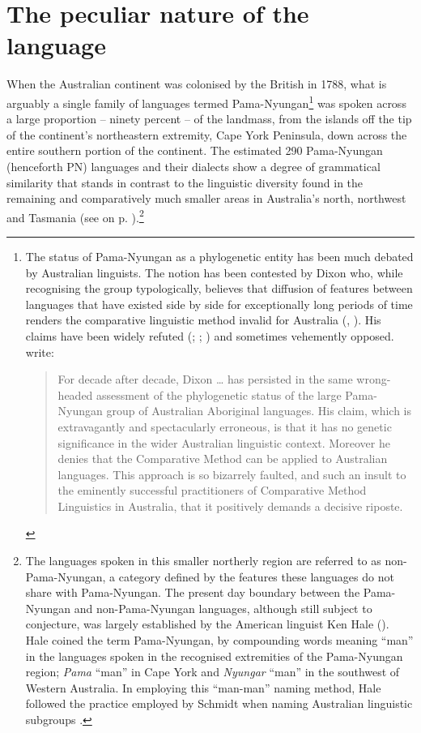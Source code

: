 \chapter{The peculiar nature of the language}
\label{chap:key:1}

When the Australian continent was colonised by the British in 1788, what is arguably a single family of languages \citep{bowern_computational_2012} termed Pama-Nyungan\footnote{The status of Pama-Nyungan as a phylogenetic entity has been much debated by Australian linguists. The notion has been contested by Dixon who, while recognising the group typologically, believes that diffusion of features between languages that have existed side by side for exceptionally long periods of time renders the comparative linguistic method invalid for Australia (\citeyear[225--226, 226--227]{dixon_languages_1980}, \citeyear[xix, 48, 53]{dixon_australian_2002}). His claims have been widely refuted (\citealt{bowern_anotherlook_2006, bowern_computational_2012}; \citealt{evans_enigma_1998}; \citealt[40]{koch_historical_2014}) and sometimes vehemently opposed. \citet*[69]{ogrady_coherence_2004} write: 

\begin{quote}
For decade after decade, Dixon … has persisted in the same wrong-headed assessment of the phylogenetic status of the large Pama-Nyungan group of Australian Aboriginal languages. His claim, which is extravagantly and spectacularly erroneous, is that it has no genetic significance in the wider Australian linguistic context. Moreover he denies that the Comparative Method can be applied to Australian languages.
This approach is so bizarrely faulted, and such an insult to the eminently successful practitioners of Comparative Method Linguistics in Australia, that it positively demands a decisive riposte.
\end{quote}} was spoken across a large proportion -- ninety percent -- of the landmass, from the islands off the tip of the continent's northeastern extremity, Cape York Peninsula, down across the entire southern portion of the continent. The estimated 290 Pama-Nyungan (henceforth PN) languages and their dialects \citep[817]{bowern_computational_2012} show a degree of grammatical similarity that stands in contrast to the linguistic diversity found in the remaining and comparatively much smaller areas in Australia’s north, northwest and Tasmania (see  on p. \pageref{tab:chap1:map}).\footnote{The languages spoken in this smaller northerly region are referred to as non-Pama-Nyungan, a category defined by the features these languages do not share with Pama-Nyungan. The present day boundary between the Pama-Nyungan and non-Pama-Nyungan languages, although still subject to conjecture, was largely established by the American linguist Ken Hale (\citeyear{Hale_1961}). Hale coined the term Pama-Nyungan, by compounding words meaning “man” in the languages spoken in the recognised extremities of the Pama-Nyungan region; \textit{Pama} “man” in Cape York and \textit{Nyungar} “man” in the southwest of Western Australia. In employing this “man-man” naming method, Hale followed the practice employed by Schmidt when naming Australian linguistic subgroups \citep[20]{koch_arandic_2004}.}

